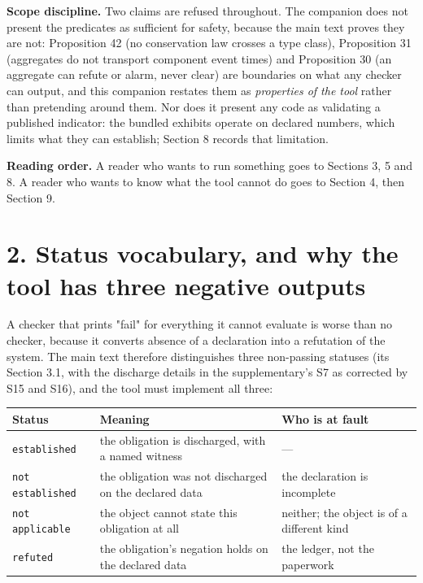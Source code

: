 \documentclass[11pt]{article}
\begin{document}
\textbf{Scope discipline.} Two claims are refused throughout. The companion does not present the predicates as sufficient for safety, because the main text proves they are not: Proposition 42 (no conservation law crosses a type class), Proposition 31 (aggregates do not transport component event times) and Proposition 30 (an aggregate can refute or alarm, never clear) are boundaries on what any checker can output, and this companion restates them as \emph{properties of the tool} rather than pretending around them. Nor does it present any code as validating a published indicator: the bundled exhibits operate on declared numbers, which limits what they can establish; Section 8 records that limitation.

\textbf{Reading order.} A reader who wants to run something goes to Sections 3, 5 and 8. A reader who wants to know what the tool cannot do goes to Section 4, then Section 9.

\vspace{0.8em}

\section*{2. Status vocabulary, and why the tool has three negative outputs}\label{2-status-vocabulary-and-why-the-tool-has-three-negative-outputs}

A checker that prints "fail" for everything it cannot evaluate is worse than no checker, because it converts absence of a declaration into a refutation of the system. The main text therefore distinguishes three non-passing statuses (its Section 3.1, with the discharge details in the supplementary's S7 as corrected by S15 and S16), and the tool must implement all three:

\begin{longtable}{@{}l|p{70mm}|l@{}}
\toprule
Status & Meaning & Who is at fault \\
\midrule
\texttt{established} & the obligation is discharged, with a named witness & --- \\
\texttt{not established} & the obligation was not discharged on the declared data & the declaration is incomplete \\
\texttt{not applicable} & the object cannot state this obligation at all & neither; the object is of a different kind \\
\texttt{refuted} & the obligation's negation holds on the declared data & the ledger, not the paperwork \\
\bottomrule
\end{longtable}
\end{document}
